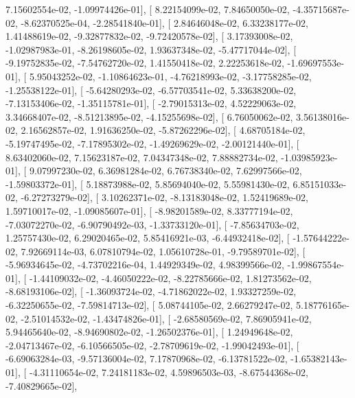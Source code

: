 \documentclass{article}
\begin{document}
          7.15602554e-02,  -1.09974426e-01],
       [  8.22154099e-02,   7.84650050e-02,  -4.35715687e-02,
         -8.62370525e-04,  -2.28541840e-01],
       [  2.84646048e-02,   6.33238177e-02,   1.41488619e-02,
         -9.32877832e-02,  -9.72420578e-02],
       [  3.17393008e-02,  -1.02987983e-01,  -8.26198605e-02,
          1.93637348e-02,  -5.47717044e-02],
       [ -9.19752835e-02,  -7.54762720e-02,   1.41550418e-02,
          2.22253618e-02,  -1.69697553e-01],
       [  5.95043252e-02,  -1.10864623e-01,  -4.76218993e-02,
         -3.17758285e-02,  -1.25538122e-01],
       [ -5.64280293e-02,  -6.57703541e-02,   5.33638200e-02,
         -7.13153406e-02,  -1.35115781e-01],
       [ -2.79015313e-02,   4.52229063e-02,   3.34668407e-02,
         -8.51213895e-02,  -4.15255698e-02],
       [  6.76050062e-02,   3.56138016e-02,   2.16562857e-02,
          1.91636250e-02,  -5.87262296e-02],
       [  4.68705184e-02,  -5.19747495e-02,  -7.17895302e-02,
         -1.49269629e-02,  -2.00121440e-01],
       [  8.63402060e-02,   7.15623187e-02,   7.04347348e-02,
          7.88882734e-02,  -1.03985923e-01],
       [  9.07997230e-02,   6.36981284e-02,   6.76738340e-02,
          7.62997566e-02,  -1.59803372e-01],
       [  5.18873988e-02,   5.85694040e-02,   5.55981430e-02,
          6.85151033e-02,  -6.27273279e-02],
       [  3.10262371e-02,  -8.13183048e-02,   1.52419689e-02,
          1.59710017e-02,  -1.09085607e-01],
       [ -8.98201589e-02,   8.33777194e-02,  -7.03072270e-02,
         -6.90790492e-03,  -1.33733120e-01],
       [ -7.85634703e-02,   1.25757430e-02,   6.29020465e-02,
          5.85416921e-03,  -6.44932418e-02],
       [ -1.57644222e-02,   7.92669114e-03,   6.07810794e-02,
          1.05610728e-01,  -9.79589701e-02],
       [ -5.96934645e-02,  -4.73702216e-04,   1.44929349e-02,
          4.98399566e-02,  -1.99867554e-01],
       [ -1.44109032e-02,  -4.46050222e-02,  -8.22785666e-02,
          1.81273562e-02,  -8.68193106e-02],
       [ -1.36093724e-02,  -4.71862022e-02,   1.93327259e-02,
         -6.32250655e-02,  -7.59814713e-02],
       [  5.08744105e-02,   2.66279247e-02,   5.18776165e-02,
         -2.51014532e-02,  -1.43474826e-01],
       [ -2.68580569e-02,   7.86905941e-02,   5.94465640e-02,
         -8.94690802e-02,  -1.26502376e-01],
       [  1.24949648e-02,  -2.04713467e-02,  -6.10566505e-02,
         -2.78709619e-02,  -1.99042493e-01],
       [ -6.69063284e-03,  -9.57136004e-02,   7.17870968e-02,
         -6.13781522e-02,  -1.65382143e-01],
       [ -4.31110654e-02,   7.24181183e-02,   4.59896503e-03,
         -8.67544368e-02,  -7.40829665e-02],
\end{document}
